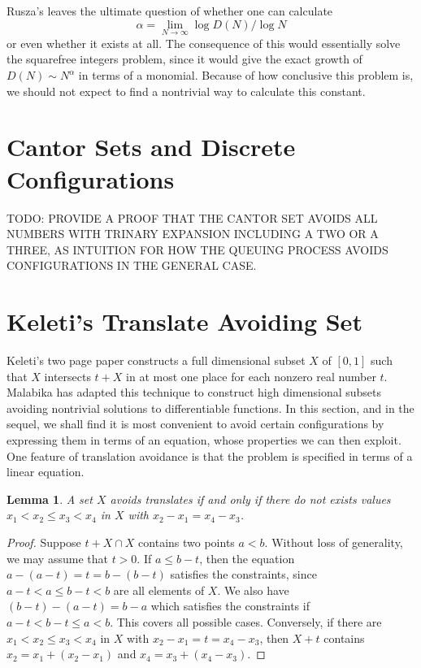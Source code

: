 \documentclass{report}
\theoremstyle{plain}
\newtheorem{lemma}{Lemma}
\theoremstyle{plain}
\begin{document}
Rusza's leaves the ultimate question of whether one can calculate
%
\[ \alpha = \lim_{N \to \infty} \log D(N) / \log N \]
%
or even whether it exists at all. The consequence of this would essentially solve the squarefree integers problem, since it would give the exact growth of $D(N) \sim N^\alpha$ in terms of a monomial. Because of how conclusive this problem is, we should not expect to find a nontrivial way to calculate this constant.






\section{Cantor Sets and Discrete Configurations}

TODO: PROVIDE A PROOF THAT THE CANTOR SET AVOIDS ALL NUMBERS WITH TRINARY EXPANSION INCLUDING A TWO OR A THREE, AS INTUITION FOR HOW THE QUEUING PROCESS AVOIDS CONFIGURATIONS IN THE GENERAL CASE.









\section{Keleti's Translate Avoiding Set}

Keleti's two page paper constructs a full dimensional subset $X$ of $[0,1]$ such that $X$ intersects $t + X$ in at most one place for each nonzero real number $t$. Malabika has adapted this technique to construct high dimensional subsets avoiding nontrivial solutions to differentiable functions. In this section, and in the sequel, we shall find it is most convenient to avoid certain configurations by expressing them in terms of an equation, whose properties we can then exploit. One feature of translation avoidance is that the problem is specified in terms of a linear equation.

\begin{lemma}
    A set $X$ avoids translates if and only if there do not exists values $x_1 < x_2 \leq x_3 < x_4$ in $X$ with $x_2 - x_1 = x_4 - x_3$.
\end{lemma}
\begin{proof}

    Suppose $t + X \cap X$ contains two points $a < b$. Without loss of generality, we may assume that $t > 0$. If $a \leq b - t$, then the equation $a - (a - t) = t = b - (b - t)$ satisfies the constraints, since $a - t < a \leq b - t < b$ are all elements of $X$. We also have $(b - t) - (a - t) = b - a$ which satisfies the constraints if $a - t < b - t \leq a < b$. This covers all possible cases. Conversely, if there are $x_1 < x_2 \leq x_3 < x_4$ in $X$ with $x_2 - x_1 = t = x_4 - x_3$, then $X + t$ contains $x_2 = x_1 + (x_2 - x_1)$ and $x_4 = x_3 + (x_4 - x_3)$.
\end{proof}
\end{document}
